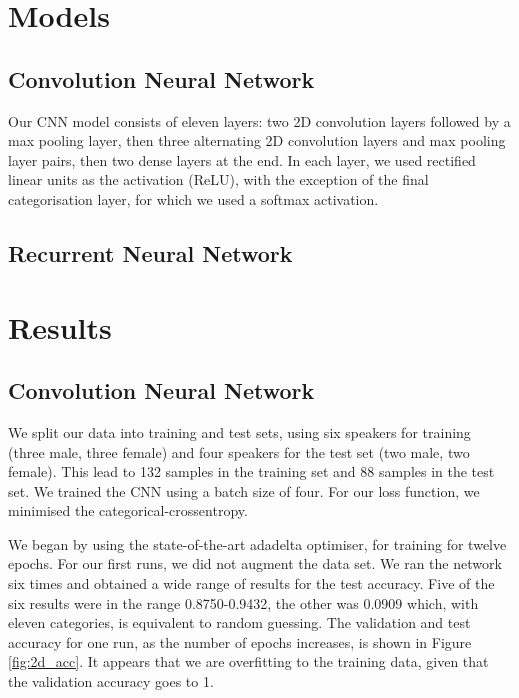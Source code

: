 \documentclass{article} %
\begin{document}
\section{Models}
\subsection{Convolution Neural Network}
Our CNN model consists of eleven layers: two 2D convolution layers followed by a max pooling layer, then three alternating 2D convolution layers and max pooling layer pairs, then two dense layers at the end. In each layer, we used rectified linear units as the activation (ReLU), with the exception of the final categorisation layer, for which we used a softmax activation. 
 
\subsection{Recurrent Neural Network}

\section{Results}
\subsection{Convolution Neural Network}
We split our data into training and test sets, using six speakers for training (three male, three female) and four speakers for the test set (two male, two female). This lead to 132 samples in the training set and 88 samples in the test set. We trained the CNN using a batch size of four. For our loss function, we minimised the categorical-crossentropy.

We began by using the state-of-the-art adadelta optimiser, for training for twelve epochs. For our first runs, we did not augment the data set. We ran the network six times and obtained a wide range of results for the test accuracy. Five of the six results were in the range 0.8750-0.9432, the other was 0.0909 which, with eleven categories, is equivalent to random guessing. The validation and test accuracy for one run, as the number of epochs increases, is shown in Figure \ref{fig:2d_acc}. It appears that we are overfitting to the training data, given that the validation accuracy goes to 1. 
\end{document}
